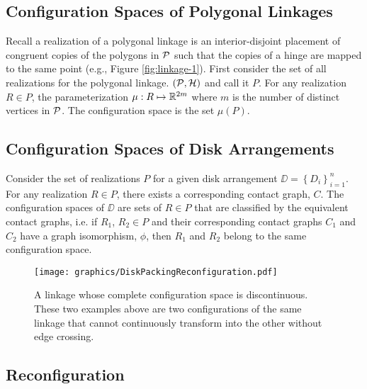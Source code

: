  
 \subsection{Configuration Spaces of Polygonal Linkages}
Recall a realization of a polygonal linkage is an interior-disjoint placement of 
congruent copies of the polygons in ${\cal P}$ such that the copies of a hinge are mapped to the same point (e.g., Figure \ref{fig:linkage-1}).
First consider the set of all realizations for the polygonal linkage. $\left({\cal P},{\cal H}
\right)$ and call it $P$.  For any realization $R \in P$, the parameterization $\mu:R \mapsto {\mathbb{R}}^{2m}$ where $m$ is the number of distinct vertices in ${\cal P}$.     The configuration space is the set $\mu(P)$.

 \subsection{Configuration Spaces of Disk Arrangements}
Consider the set of realizations $P$ for a given disk arrangement $\DD = \left\lbrace D_i \right\rbrace_{i=1}^n$.  For any realization $R \in P$, there exists a corresponding contact graph, $C$.  The configuration spaces of $\DD$ are sets of $R \in P$ that are classified by the equivalent contact graphs, i.e. if $R_1$, $R_2 \in P$ and their corresponding contact graphs $C_1$ and $C_2$ have a graph isomorphism, $\phi$, then $R_1$ and $R_2$ belong to the same configuration space.



\begin{figure}[!h]
\begin{center}
\texttt{[image: graphics/DiskPackingReconfiguration.pdf]}
\end{center} 
\caption{A linkage whose complete configuration space is discontinuous.  These two examples above 
are two configurations of the same linkage that cannot continuously transform into the other 
without edge crossing.}
\label{fig:configuration-5}
\end{figure}

\subsection{Reconfiguration}



